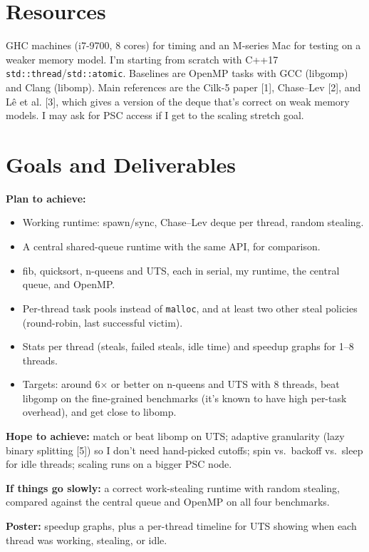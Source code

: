 \documentclass[11pt]{article}
\begin{document}
\section*{Resources}
GHC machines (i7-9700, 8 cores) for timing and an M-series Mac for testing on a
weaker memory model. I'm starting from scratch with C++17
\texttt{std::thread}/\texttt{std::atomic}. Baselines are OpenMP tasks with GCC
(libgomp) and Clang (libomp). Main references are the Cilk-5 paper [1],
Chase--Lev [2], and L\^e et al. [3], which gives a version of the deque that's
correct on weak memory models. I may ask for PSC access if I get to the scaling
stretch goal.

\section*{Goals and Deliverables}
\textbf{Plan to achieve:}
\begin{itemize}
  \item Working runtime: spawn/sync, Chase--Lev deque per thread, random stealing.
  \item A central shared-queue runtime with the same API, for comparison.
  \item fib, quicksort, n-queens and UTS, each in serial, my runtime, the
        central queue, and OpenMP.
  \item Per-thread task pools instead of \texttt{malloc}, and at least two other
        steal policies (round-robin, last successful victim).
  \item Stats per thread (steals, failed steals, idle time) and speedup graphs for
        1--8 threads.
  \item Targets: around 6$\times$ or better on n-queens and UTS with 8 threads,
        beat libgomp on the fine-grained benchmarks (it's known to have high
        per-task overhead), and get close to libomp.
\end{itemize}

\noindent\textbf{Hope to achieve:} match or beat libomp on UTS; adaptive
granularity (lazy binary splitting [5]) so I don't need hand-picked cutoffs;
spin vs.\ backoff vs.\ sleep for idle threads; scaling runs on a bigger PSC node.

\medskip
\noindent\textbf{If things go slowly:} a correct work-stealing runtime with random
stealing, compared against the central queue and OpenMP on all four benchmarks.

\medskip
\noindent\textbf{Poster:} speedup graphs, plus a per-thread timeline for UTS
showing when each thread was working, stealing, or idle.
\end{document}

